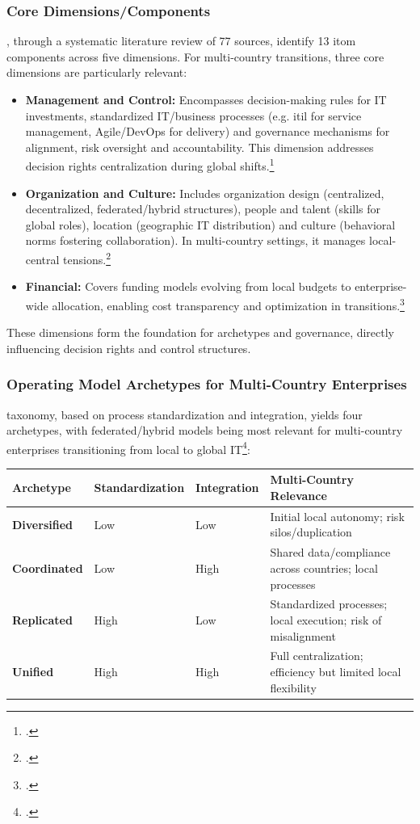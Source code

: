 \subsubsection{Core Dimensions/Components}
\label{subsubsec:ITOperatingModelsCoreDimensions}
\cite{sulemanITOperatingModels2025}, through a systematic literature review of 77 sources, identify 13 \ac{itom} components across five dimensions.
For multi-country transitions, three core dimensions are particularly relevant:
\begin{itemize}
    \item \textbf{Management and Control:} Encompasses decision-making rules for IT investments, standardized IT/business processes (e.g. \ac{itil} for service management, Agile/DevOps for delivery) and governance mechanisms for alignment, risk oversight and accountability. This dimension addresses decision rights centralization during global shifts.\footcite[14-15]{sulemanITOperatingModels2025}
    \item \textbf{Organization and Culture:} Includes organization design (centralized, decentralized, federated/hybrid structures), people and talent (skills for global roles), location (geographic IT distribution) and culture (behavioral norms fostering collaboration). In multi-country settings, it manages local-central tensions.\footcite[15]{sulemanITOperatingModels2025}
    \item \textbf{Financial:} Covers funding models evolving from local budgets to enterprise-wide allocation, enabling cost transparency and optimization in transitions.\footcite[16]{sulemanITOperatingModels2025}
\end{itemize}

These dimensions form the foundation for archetypes and governance, directly influencing decision rights and control structures.

\subsubsection{Operating Model Archetypes for Multi-Country Enterprises}
\label{subsubsec:ITOperatingModelArchetypes}
\cite{rossForgetStrategyFocus2005} taxonomy, based on process standardization and integration, yields four archetypes, with federated/hybrid models being most relevant for multi-country enterprises transitioning from local to global IT\footcite[5-6]{sulemanITOperatingModels2025}:
\begin{tabular}{p{3cm}p{4cm}p{4cm}}
    \toprule
    \textbf{Archetype} & \textbf{Standardization} & \textbf{Integration} & \textbf{Multi-Country Relevance} \\
    \midrule
    \textbf{Diversified} & Low & Low & Initial local autonomy; risk silos/duplication \\
    \textbf{Coordinated} & Low & High & Shared data/compliance across countries; local processes \\
    \textbf{Replicated} & High & Low & Standardized processes; local execution; risk of misalignment \\
    \textbf{Unified} & High & High & Full centralization; efficiency but limited local flexibility \\
    \bottomrule
\end{tabular}

